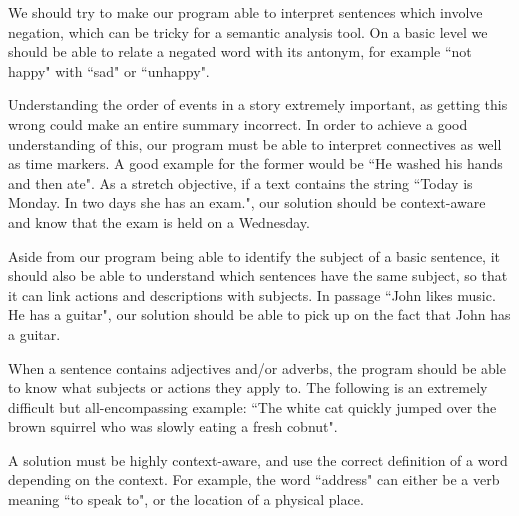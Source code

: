 \begin{objective}[Negation]
We should try to make our program able to interpret sentences which involve negation, which can be tricky for a semantic analysis tool. On a basic level we should be able to relate a negated word with its antonym, for example ``not happy" with ``sad" or ``unhappy".
\end{objective}

\begin{objective}
Understanding the order of events in a story extremely important, as getting this wrong could make an entire summary incorrect. In order to achieve a good understanding of this, our program must be able to interpret connectives as well as time markers. A good example for the former would be ``He washed his hands and then ate". As a stretch objective, if a text contains the string ``Today is Monday. In two days she has an exam.", our solution should be context-aware and know that the exam is held on a Wednesday.
\end{objective}

\begin{objective}
Aside from our program being able to identify the subject of a basic sentence, it should also be able to understand which sentences have the same subject, so that it can link actions and descriptions with subjects. In passage ``John likes music. He has a guitar", our solution should be able to pick up on the fact that John has a guitar.
\end{objective}

\begin{objective}
When a sentence contains adjectives and/or adverbs, the program should be able to know what subjects or actions they apply to. The following is an extremely difficult but all-encompassing example: ``The white cat quickly jumped over the brown squirrel who was slowly eating a fresh cobnut".
\end{objective}

\begin{objective}[Context]
A solution must be highly context-aware, and use the correct definition of a word depending on the context. For example, the word ``address" can either be a verb meaning ``to speak to", or the location of a physical place.
\end{objective}